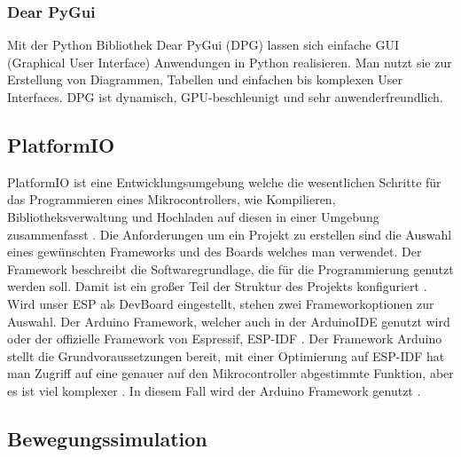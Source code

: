 \subsubsection{Dear PyGui} \label{Dear PyGui}
Mit der Python Bibliothek Dear PyGui (DPG) lassen sich einfache GUI (Graphical User Interface) Anwendungen in Python realisieren.
Man nutzt sie zur Erstellung von Diagrammen, Tabellen und einfachen bis komplexen User Interfaces.
DPG ist dynamisch, GPU-beschleunigt und sehr anwenderfreundlich. \cite{dpg_docu}

\subsection{PlatformIO} %
PlatformIO ist eine Entwicklungsumgebung welche die wesentlichen Schritte für das Programmieren eines Mikrocontrollers, wie Kompilieren, Bibliotheksverwaltung und 
Hochladen auf diesen in einer Umgebung zusammenfasst \cite{platformio}. Die Anforderungen um ein Projekt zu erstellen sind die Auswahl eines
gewünschten Frameworks und des Boards welches man verwendet. Der Framework beschreibt die Softwaregrundlage, die für die Programmierung 
genutzt werden soll. Damit ist ein großer Teil der Struktur des Projekts konfiguriert \cite{software_framework_wikipedia}. Wird unser ESP als DevBoard eingestellt, stehen zwei Frameworkoptionen
zur Auswahl. Der Arduino Framework, welcher auch in der ArduinoIDE genutzt wird
oder der offizielle Framework von Espressif, ESP-IDF \cite{platformio_frameworks}. Der Framework Arduino stellt die Grundvoraussetzungen bereit, 
mit einer Optimierung auf ESP-IDF hat man Zugriff auf eine genauer auf den Mikrocontroller abgestimmte Funktion, aber es ist viel komplexer \cite{espidf_framework}.
In diesem Fall wird der Arduino Framework genutzt \cite{arduino_framework}. 

\subsection{Bewegungssimulation} %
